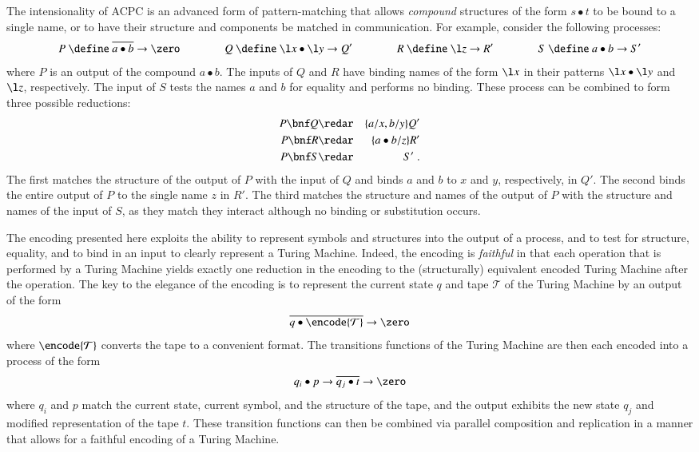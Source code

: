 \documentclass[submission,copyright,creativecommons]{eptcs}
\renewcommand{\iap}[1]{#1\to}
\renewcommand{\oap}[1]{\overline{#1}\to}
\begin{document}
The intensionality of ACPC is an advanced form of pattern-matching
that allows {\em compound} structures of the form $s\bullet t$ to be bound to a single
name, or to have their structure and components be matched in communication.
For example, consider the following processes:
\begin{equation*}
P \ \define\  \oap {a\bullet b}\zero\qquad\qquad
Q \ \define\  \iap {\l x\bullet \l y} Q'\qquad\qquad
R \ \define\  \iap {\l z} R'\qquad\qquad
S \ \define\  \iap {a\bullet b}S'
\end{equation*}
where $P$ is an output of the compound $a\bullet b$.
The inputs of $Q$ and $R$ have binding names of the form $\l x$ in their
patterns $\l x\bullet \l y$ and $\l z$, respectively.
The input of $S$ tests the names $a$ and $b$ for equality and performs no binding.
These process can be combined to form three possible reductions:
\begin{eqnarray*}
P\bnf Q &\redar& \{a/x,b/y\}Q'\\
P\bnf R &\redar& \{a\bullet b/z\}R'\\
P\bnf S &\redar& S'\; .
\end{eqnarray*}
The first matches the structure of the output of $P$ with the input of $Q$ and binds
$a$ and $b$ to $x$ and $y$, respectively, in $Q'$.
The second binds the entire output of $P$ to the single name $z$ in $R'$.
The third matches the structure and names of the output of $P$ with the structure
and names of the input of $S$, as they match they interact although no binding
or substitution occurs.

The encoding presented here exploits the ability to represent symbols and structures
into the output of a process, and to test for structure, equality, and to bind in
an input to clearly represent a Turing Machine.
Indeed, the encoding is {\em faithful} in that each operation that is performed
by a Turing Machine yields exactly one reduction in the encoding to the (structurally)
equivalent encoded Turing Machine after the operation.
The key to the elegance of the encoding is to represent the current state $q$ and
tape ${\mathcal T}$ of the Turing Machine by an output of the form
\begin{equation*}
\oap {q\bullet\encode {{\mathcal T}}} \zero
\end{equation*}
where $\encode{{\mathcal T}}$ converts the tape to a convenient format.
The transitions functions of the Turing Machine are then each encoded into
a process of the form
\begin{equation*}
\iap {q_i\bullet p}  \oap {q_j\bullet t} \zero
\end{equation*}
where $q_i$ and $p$ match the current state, current symbol, and the structure of the
tape, and the output exhibits the new state $q_j$ and modified representation of the tape $t$.
These transition functions can then be combined via parallel composition and replication
in a manner that allows for a faithful encoding of a Turing Machine.
\end{document}
